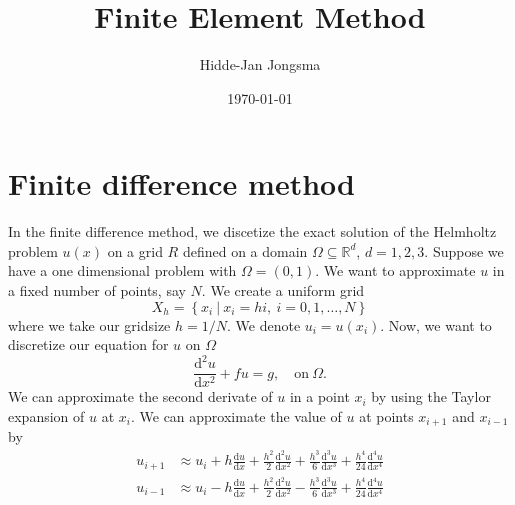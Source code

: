 \documentclass[a4paper]{article}
\author{Hidde-Jan Jongsma}
\title{Finite Element Method}
\date{\today}
\newcommand{\Reals}{\mathbb{R}}
\newcommand{\dd}{\mathrm{d}}
\begin{document}
\section{Finite difference method}

In the finite difference method, we discetize the exact solution of
the Helmholtz problem $u(x)$ on a grid $R$ defined on a domain $\Omega
\subseteq \Reals^d$, $d = 1, 2, 3$. Suppose we have a one dimensional
problem with $\Omega = (0, 1)$. We want to approximate $u$ in a fixed
number of points, say $N$. We create a uniform grid
\begin{equation}
  X_h = \left\{ x_i\ |\ x_i = h i,\ i = 0, 1, \ldots, N \right\}
\end{equation}
where we take our gridsize $h = 1/N$. We denote $u_i = u(x_i)$. Now,
we want to discretize our equation for $u$ on $\Omega$
\begin{equation}
  \frac{\dd^2 u}{\dd x^2} + f u = g, \quad \text{on}\ \Omega.
\end{equation}
We can approximate the second derivate of $u$ in a point $x_i$ by
using the Taylor expansion of $u$ at $x_i$. We can approximate the
value of $u$ at points $x_{i + 1}$ and $x_{i - 1}$ by
\begin{align}
  u_{i + 1} & \approx u_{i} + h \frac{\dd u}{\dd x}
    + \frac{h^2}{2} \frac{\dd^2 u}{\dd x^2}
    + \frac{h^3}{6} \frac{\dd^3 u}{\dd x^3}
    + \frac{h^4}{24} \frac{\dd^4 u}{\dd x^4} \\
%
  u_{i - 1} & \approx u_{i} - h \frac{\dd u}{\dd x}
    + \frac{h^2}{2} \frac{\dd^2 u}{\dd x^2}
    - \frac{h^3}{6} \frac{\dd^3 u}{\dd x^3}
    + \frac{h^4}{24} \frac{\dd^4 u}{\dd x^4}
\end{align}
\end{document}
